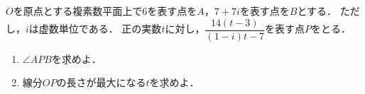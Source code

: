 \documentclass[../../main.tex]{subfiles}
\begin{document}
$O$を原点とする複素数平面上で6を表す点を$A$，$7+7i$を表す点を$B$とする．
ただし，$i$は虚数単位である．
正の実数$t$に対し，$\displaystyle\dfrac{14(t-3)}{(1-i)t-7}$を表す点$P$をとる．
\begin{enumerate}
  \item $\angle APB$を求めよ．
  \item 線分$OP$の長さが最大になる$t$を求めよ．
\end{enumerate}
\end{document}

